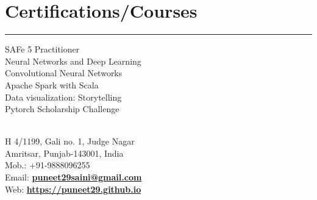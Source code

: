 \documentclass[]{puneet-resume}
\begin{document}
\begin{minipage}[t]{0.33\textwidth}
\section{Certifications/Courses}
\noindent\rule{5cm}{0.4pt}

SAFe 5 Practitioner\\
Neural Networks and Deep Learning\\
Convolutional Neural Networks\\
Apache Spark with Scala\\
Data visualization: Storytelling\\
Pytorch Scholarship Challenge
\sectionsep
%
%

\end{minipage} 
\hfill
\begin{minipage}[t]{0.66\textwidth}
\hspace*{0pt}\hfill    \\
\hspace*{0pt}\hfill H 4/1199, Gali no. 1, Judge Nagar \\
\hspace*{0pt}\hfill Amritsar, Punjab-143001, India \\
\hspace*{0pt}\hfill Mob.: +91-9888096255 \\
\hspace*{0pt}\hfill Email: \textbf{\href{mailto:puneet29saini@gmail.com}{puneet29saini@gmail.com}} \\
\hspace*{0pt}\hfill Web: \textbf{\href{https://puneet29.github.io}{https://puneet29.github.io}}

\end{minipage}
\end{document}
